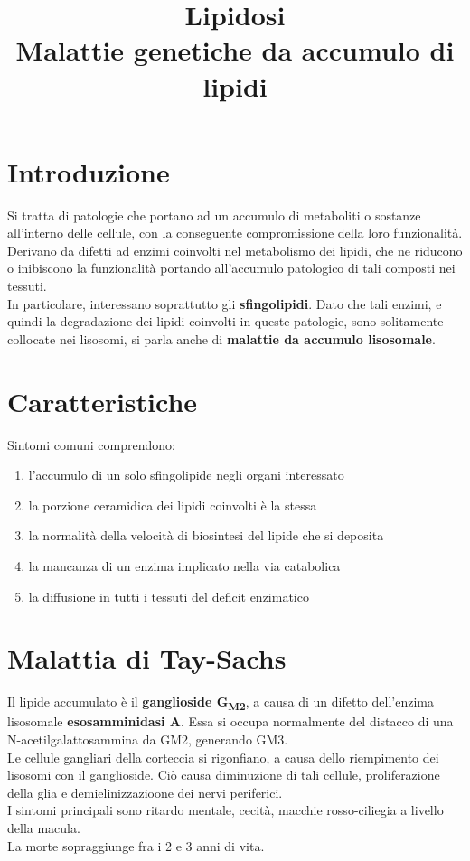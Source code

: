 \documentclass[a4paper, 12pt]{article}
\date{}
\title{%
  Lipidosi \\
  \large Malattie genetiche da accumulo di lipidi
}
\begin{document}
\maketitle

\section{Introduzione}
Si tratta di patologie che portano ad un accumulo di metaboliti o sostanze all'interno delle cellule, con la conseguente compromissione della loro funzionalità.\\
Derivano da difetti ad enzimi coinvolti nel metabolismo dei lipidi, che ne riducono o inibiscono la funzionalità portando all'accumulo patologico di tali composti nei tessuti.\\
In particolare, interessano soprattutto gli \textbf{sfingolipidi}.
Dato che tali enzimi, e quindi la degradazione dei lipidi coinvolti in queste patologie, sono solitamente collocate nei lisosomi, si parla anche di \textbf{malattie da accumulo lisosomale}.

\section{Caratteristiche}
Sintomi comuni comprendono:
\begin{enumerate}
\item l'accumulo di un solo sfingolipide negli organi interessato
\item la porzione ceramidica dei lipidi coinvolti è la stessa
\item la normalità della velocità di biosintesi del lipide che si deposita
\item la mancanza di un enzima implicato nella via catabolica
\item la diffusione in tutti i tessuti del deficit enzimatico
\end{enumerate}

\section{Malattia di Tay-Sachs}
Il lipide accumulato è il \textbf{ganglioside G\textsubscript{M2}}, a causa di un difetto dell'enzima lisosomale \textbf{esosamminidasi A}. Essa si occupa normalmente del distacco di una N-acetilgalattosammina da GM2, generando GM3.\\
Le cellule gangliari della corteccia si rigonfiano, a causa dello riempimento dei lisosomi con il ganglioside. Ciò causa diminuzione di tali cellule, proliferazione della glia e demielinizzazioone dei nervi periferici.\\
I sintomi principali sono ritardo mentale, cecità, macchie rosso-ciliegia a livello della macula.\\
La morte sopraggiunge fra i 2 e 3 anni di vita.
\end{document}
